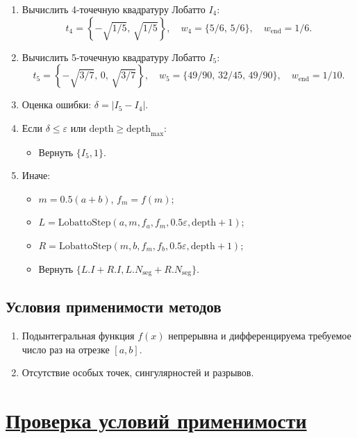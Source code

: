 \documentclass[14pt]{extarticle}
\begin{document}
	\begin{enumerate}[noitemsep]
		\item Вычислить 4-точечную квадратуру Лобатто $I_4$:
		\[
		t_{4} = \left\{-\sqrt{1/5}, \, \sqrt{1/5}\right\}, \quad w_4 = \{5/6, \, 5/6\}, \quad w_{\text{end}} = 1/6.
		\]
		\item Вычислить 5-точечную квадратуру Лобатто $I_5$:
		\[
		t_{5} = \left\{-\sqrt{3/7}, \, 0, \, \sqrt{3/7}\right\}, \quad w_5 = \{49/90, \, 32/45, \, 49/90\}, \quad w_{\text{end}} = 1/10.
		\]
		\item Оценка ошибки: $\delta = |I_5 - I_4|$.
		\item Если $\delta \le \varepsilon$ или $\text{depth} \ge \text{depth}_{\max}$:
		\begin{itemize}[noitemsep]
			\item Вернуть $\{I_5, 1\}$.
		\end{itemize}
		\item Иначе:
		\begin{itemize}[noitemsep]
			\item $m = 0.5(a + b)$, $f_m = f(m)$;
			\item $L = \text{LobattoStep}(a, m, f_a, f_m, 0.5\varepsilon, \text{depth} + 1)$;
			\item $R = \text{LobattoStep}(m, b, f_m, f_b, 0.5\varepsilon, \text{depth} + 1)$;
			\item Вернуть $\{L.I + R.I, L.N_{\text{seg}} + R.N_{\text{seg}}\}$.
		\end{itemize}
	\end{enumerate}
	
	\subsection{Условия применимости методов}
	
	\begin{enumerate}[noitemsep]
		\item Подынтегральная функция $f(x)$ непрерывна и дифференцируема требуемое число раз на отрезке $[a, b]$.
		\item Отсутствие особых точек, сингулярностей и разрывов.

	\end{enumerate}
	
	
	\newpage
	\section{\Large \underline{Проверка условий применимости}}
	
\end{document}
